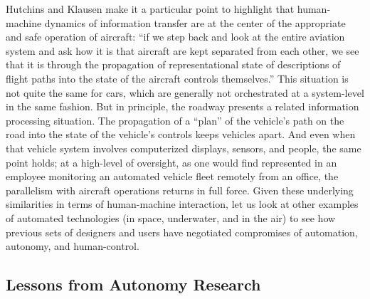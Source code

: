 Hutchins and Klausen make it a particular point to highlight that
human-machine dynamics of information transfer are at the center of
the appropriate and safe operation of aircraft: ``if we step back and
look at the entire aviation system and ask how
it is that aircraft are kept separated from each other, we see that it
is through the propagation of representational state of descriptions
of flight paths into the state of the aircraft controls
themselves.''\cite[p. 14]{hutchinsKlausen} This situation is not quite
the same for cars, which are generally not orchestrated at a
system-level in the same fashion. But in principle, the roadway presents a related
information processing situation. The propagation of a ``plan'' of the
vehicle's path on the 
road into the state of the vehicle's controls keeps vehicles apart.
And even when that vehicle system involves computerized
displays, sensors, and people, the same point holds;  at a high-level of oversight, as
one would find represented in an employee monitoring an automated vehicle fleet remotely
from an office, the parallelism with aircraft operations returns in
full force. Given these underlying
similarities in terms of human-machine interaction, let us look at
other examples of automated technologies (in space, underwater, and in
the air) to see how previous sets of designers and users have
negotiated compromises of automation, autonomy, and human-control.








\subsection{Lessons from Autonomy Research}

